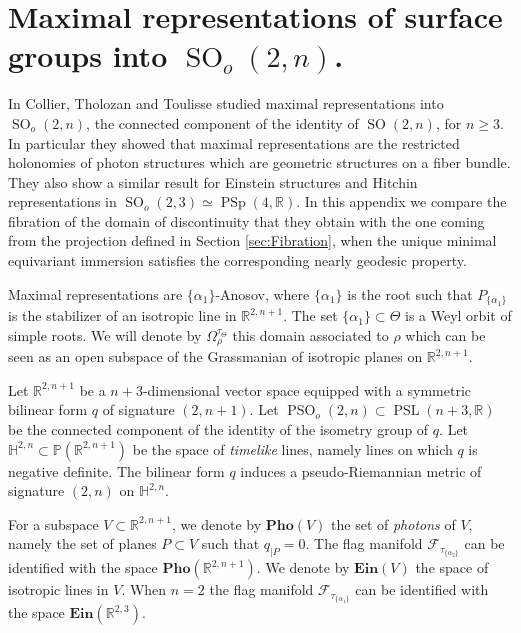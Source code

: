 \documentclass[reqno,10pt]{amsart}
\theoremstyle{plain}
\theoremstyle{definition}
\theoremstyle{remark}
\newcommand{\type}{\tau}
\newcommand{\R}{\mathbb{R}}
\DeclareMathOperator{\PSL}{PSL}
\DeclareMathOperator{\PSO}{PSO}
\DeclareMathOperator{\SO}{SO}
\DeclareMathOperator{\PSp}{PSp}
\newcommand{\Ein}{\mathbf{Ein}}
\newcommand{\Pho}{\mathbf{Pho}}
\newcommand{\ie}{namely }
\begin{document}
\newpage 

\appendix
\section{Maximal representations of surface groups into \texorpdfstring{$\SO_o(2,n)$}{SO(2,n)}.}
\label{appendix:CCT}
In \cite{Collier_2019} Collier, Tholozan and Toulisse studied maximal representations into $\SO_o(2,n)$, the connected component of the identity of $\SO(2,n)$, for $n\geq 3$. In particular they showed that maximal representations are the restricted holonomies of photon structures which are geometric structures on a fiber bundle. They also show a similar result for Einstein structures and Hitchin representations in $\SO_o(2,3)\simeq \PSp(4,\R)$. In this appendix we compare the fibration of the domain of discontinuity that they obtain with the one coming from the projection defined in Section \ref{sec:Fibration}, when the unique minimal equivariant immersion satisfies the corresponding nearly geodesic property.

\medskip

Maximal representations are $\lbrace\alpha_1\rbrace$-Anosov, where $\lbrace\alpha_1\rbrace$ is the root such that $P_{\lbrace\alpha_1\rbrace}$ is the stabilizer of an isotropic line in $\R^{2,n+1}$. 
The set $\lbrace\alpha_1\rbrace\subset \Theta$ is a Weyl orbit of simple roots. We will denote by $\Omega^{\type_\Theta}_\rho$ this domain associated to $\rho$ which can be seen as an open subspace of the Grassmanian of isotropic planes on $\R^{2,n+1}$.


\medskip

Let $\R^{2,n+1}$ be a $n+3$-dimensional vector space equipped with a symmetric bilinear form $q$ of signature $(2,n+1)$. Let $\PSO_o(2,n)\subset \PSL(n+3,\R)$ be the connected component of the identity of the isometry group of $q$. Let $\mathbb{H}^{2,n}\subset \mathbb{P}\left(\R^{2,n+1}\right)$ be the space of \emph{timelike} lines, \ie lines on which $q$ is negative definite. The bilinear form $q$ induces a pseudo-Riemannian metric of signature $(2,n)$ on $\mathbb{H}^{2,n}$. 

For a subspace $V\subset \R^{2,n+1}$, we denote by $\Pho(V)$ the set of \emph{photons} of $V$, \ie the set of planes $P\subset V$ such that $q_{|P}=0$.  The flag manifold $\mathcal{F}_{\type_{\lbrace\alpha_2\rbrace}}$ can be identified with the space $\Pho(\R^{2,n+1})$. We denote by $\Ein(V)$ the space of isotropic lines in $V$. When $n=2$ the flag manifold $\mathcal{F}_{\type_{\lbrace\alpha_1\rbrace}}$ can be identified with the space $\Ein(\R^{2,3})$.
\end{document}
